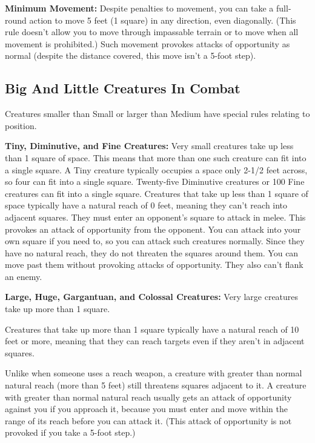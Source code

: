 \textbf{Minimum Movement:} Despite penalties to movement, you can take a full-round 
action to move 5 feet (1 square) in any direction, even diagonally. (This rule 
doesn't allow you to move through impassable terrain or to move when all movement 
is prohibited.) Such movement provokes attacks of opportunity as normal (despite 
the distance covered, this move isn't a 5-foot step).

\subsection{Big And Little Creatures In Combat}

Creatures smaller than Small or larger than Medium have special rules relating 
to position. 

\textbf{Tiny, Diminutive, and Fine Creatures:} Very small creatures take up less 
than 1 square of space. This means that more than one such creature can fit into 
a single square. A Tiny creature typically occupies a space only 2-1/2 feet across, 
so four can fit into a single square. Twenty-five Diminutive creatures or 100 Fine 
creatures can fit into a single square. Creatures that take up less than 1 square 
of space typically have a natural reach of 0 feet, meaning they can't reach into 
adjacent squares. They must enter an opponent's square to attack in melee. This 
provokes an attack of opportunity from the opponent. You can attack into your own 
square if you need to, so you can attack such creatures normally. Since they have 
no natural reach, they do not threaten the squares around them. You can move past 
them without provoking attacks of opportunity. They also can't flank an enemy.

\textbf{Large, Huge, Gargantuan, and Colossal Creatures:} Very large creatures 
take up more than 1 square.

Creatures that take up more than 1 square typically have a natural reach of 10 
feet or more, meaning that they can reach targets even if they aren't in adjacent 
squares.

Unlike when someone uses a reach weapon, a creature with greater than normal natural 
reach (more than 5 feet) still threatens squares adjacent to it. A creature with 
greater than normal natural reach usually gets an attack of opportunity against 
you if you approach it, because you must enter and move within the range of its 
reach before you can attack it. (This attack of opportunity is not provoked if 
you take a 5-foot step.)

